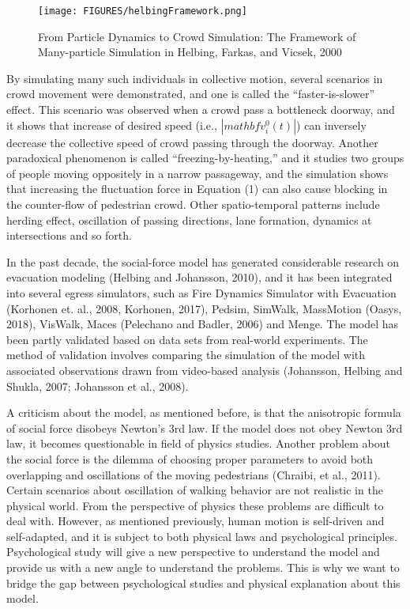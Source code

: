 \documentclass{article}
\begin{document}
%
\begin{figure}[tb]
  \centerline{\texttt{[image: FIGURES/helbingFramework.png]}}
  \caption{From Particle Dynamics to Crowd Simulation: The Framework of Many-particle Simulation in Helbing, Farkas, and Vicsek, 2000}\label{Fig_helbingFramework}
\end{figure}
%

By simulating many such individuals in collective motion, several scenarios in crowd movement were demonstrated, and one is called the “faster-is-slower” effect. This scenario was observed when a crowd pass a bottleneck doorway, and it shows that increase of desired speed (i.e., $|mathbf{v}_i^0(t)|$) can inversely decrease the collective speed of crowd passing through the doorway.  Another paradoxical phenomenon is called “freezing-by-heating,” and it studies two groups of people moving oppositely in a narrow passageway, and the simulation shows that increasing the fluctuation force in Equation (1) can also cause blocking in the counter-flow of pedestrian crowd.  Other spatio-temporal patterns include herding effect, oscillation of passing directions, lane formation, dynamics at intersections and so forth.  

In the past decade, the social-force model has generated considerable research on evacuation modeling (Helbing and Johansson, 2010), and it has been integrated into several egress simulators, such as Fire Dynamics Simulator with Evacuation (Korhonen et. al., 2008, Korhonen, 2017), Pedsim, SimWalk, MassMotion (Oasys, 2018), VisWalk, Maces (Pelechano and Badler, 2006) and Menge.   The model has been partly validated based on data sets from real-world experiments. The method of validation involves comparing the simulation of the model with associated observations drawn from video-based analysis (Johansson, Helbing and Shukla, 2007; Johansson et al., 2008).  

A criticism about the model, as mentioned before, is that the anisotropic formula of social force disobeys Newton's 3rd law. If the model does not obey Newton 3rd law, it becomes questionable in field of physics studies.  Another problem about the social force is the dilemma of choosing proper parameters to avoid both overlapping and oscillations of the moving pedestrians (Chraibi, et al., 2011).  Certain scenarios about oscillation of walking behavior are not realistic in the physical world.  From the perspective of physics these problems are difficult to deal with.  However, as mentioned previously, human motion is self-driven and self-adapted, and it is subject to both physical laws and psychological principles.  Psychological study will give a new perspective to understand the model and provide us with a new angle to understand the problems.  This is why we want to bridge the gap between psychological studies and physical explanation about this model.  
\end{document}
